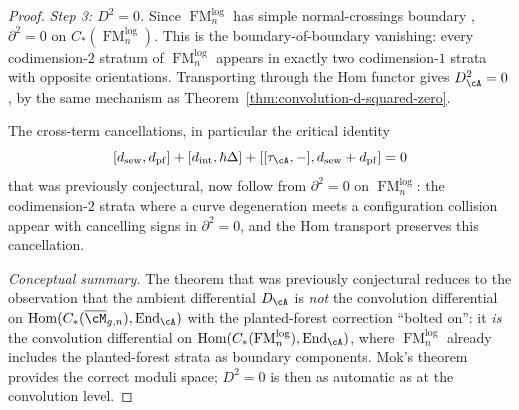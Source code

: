 \begin{proof}
\medskip
\emph{Step 3: $D^2 = 0$.}
Since $\operatorname{FM}_n^{\mathrm{log}}$ has simple
normal-crossings boundary \cite[Theorem~3.3.1(1)]{Mok25},
$\partial^2 = 0$ on $C_*(\operatorname{FM}_n^{\mathrm{log}})$.
This is the boundary-of-boundary vanishing: every
codimension-$2$ stratum of $\operatorname{FM}_n^{\mathrm{log}}$
appears in exactly two codimension-$1$ strata with opposite
orientations.  Transporting through the Hom functor gives
$D_{\cA}^2 = 0$, by the same mechanism as
Theorem~\ref{thm:convolution-d-squared-zero}.

The cross-term cancellations, in particular the critical identity
\[
  [d_{\mathrm{sew}}, d_{\mathrm{pf}}]
  + [d_{\mathrm{int}}, \hbar\Delta]
  + [[\tau_{\cA},-], d_{\mathrm{sew}} + d_{\mathrm{pf}}]
  = 0
\]
that was previously conjectural, now follow from
$\partial^2 = 0$ on $\operatorname{FM}_n^{\mathrm{log}}$:
the codimension-$2$ strata where a curve degeneration meets a
configuration collision appear with cancelling signs in
$\partial^2 = 0$, and the Hom transport preserves this
cancellation.

\emph{Conceptual summary.}  The theorem that was previously
conjectural reduces to the observation that the ambient
differential $D_{\cA}$ is \emph{not} the convolution differential
on $\operatorname{Hom}(C_*(\overline{\cM}_{g,n}),
\operatorname{End}_{\cA})$ with the planted-forest correction
``bolted on'': it \emph{is} the convolution differential on
$\operatorname{Hom}(C_*(\operatorname{FM}_n^{\mathrm{log}}),
\operatorname{End}_{\cA})$, where
$\operatorname{FM}_n^{\mathrm{log}}$ already includes the
planted-forest strata as boundary components.  Mok's theorem
\cite[Theorem~3.3.1]{Mok25} provides the correct moduli space;
$D^2 = 0$ is then as automatic as at the convolution level.
\end{proof}

